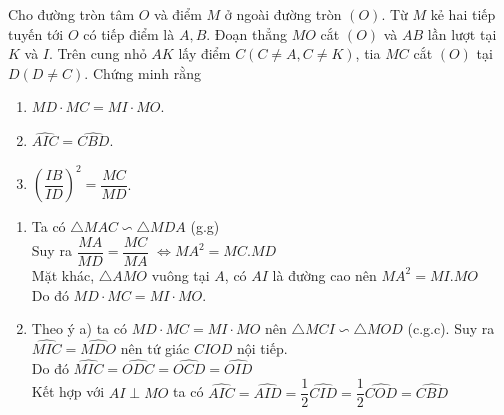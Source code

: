 \begin{ex}%
    Cho đường tròn tâm $O$ và điểm $M$ ở ngoài đường tròn $(O)$. Từ $M$ kẻ hai tiếp tuyến tới $O$ có tiếp điểm là $A, B$. Đoạn thẳng $MO$ cắt $(O)$ và $AB$ lần lượt tại $K$ và $I$. Trên cung nhỏ $AK$ lấy điểm $C (C \ne A, C \ne K)$, tia $MC$ cắt $(O)$ tại $D(D \ne C)$. Chứng minh rằng
    \begin{enumerate}
        \item  $MD \cdot MC =MI \cdot MO$.
        \item  $\widehat{AIC}=\widehat{CBD}$.
        \item  $\left( \dfrac{IB}{ID}\right)^2=\dfrac{MC}{MD}$.
       
    \end{enumerate}
\loigiai
    {
  \begin{center}
\end{center}
    \begin{enumerate}
        \item Ta có $\triangle {MAC} \backsim \triangle {MDA}$ (g.g)\\
       Suy ra $\dfrac{MA}{MD}=\dfrac{MC}{MA}$ $\Leftrightarrow MA^2=MC.MD$\\
       Mặt khác, $\triangle {AMO}$ vuông tại $A$, có $AI$ là đường cao nên $MA^2=MI.MO$\\
       Do đó $MD \cdot MC =MI \cdot MO$.
        \item Theo ý a) ta có $MD \cdot MC =MI \cdot MO$
       nên $\triangle {MCI} \backsim \triangle {MOD}$ (c.g.c). Suy ra 
      $\widehat{MIC}=\widehat{MDO}$ nên tứ giác $CIOD$ nội tiếp.\\
      Do đó $ \widehat{MIC}=\widehat{ODC}=\widehat{OCD}=\widehat{OID}$ \\
      Kết hợp với $AI \perp MO$ ta có 
        $\widehat{AIC}=\widehat{AID} =\dfrac{1}{2} \widehat{CID}=\dfrac{1}{2} \widehat{COD}=\widehat{CBD}$
        

\end{enumerate}}
\end{ex}
